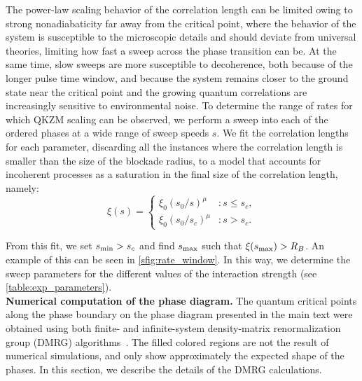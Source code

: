 \documentclass[prl,nobalancelastpage,superscriptaddress,twocolumn,nofootinbib]{revtex4}
\newcommand{\pargap}{\\[12pt]}
\begin{document}
The power-law scaling behavior of the correlation length can be limited owing to strong nonadiabaticity far away from the critical point, where the behavior of the system is susceptible to the microscopic details and should deviate from universal theories, limiting how fast a sweep across the phase transition can be. At the same time, slow sweeps are more susceptible to decoherence, both because of the longer pulse time window, and because the system remains closer to the ground state near the critical point and the growing quantum correlations are increasingly sensitive to environmental noise. To determine the range of rates for which QKZM scaling can be observed, we perform a sweep into each of the ordered phases at a wide range of sweep speeds $s$. We fit the correlation lengths for each parameter, discarding all the instances where the correlation length is smaller than the size of the blockade radius, to a model that accounts for incoherent processes as a saturation in the final size of the correlation length, namely:
\begin{equation}
\xi(s) = \begin{cases}
\xi_{0}(s_{0}/s)^{\mu} &: s\leq s_{c},\\
\xi_{0}(s_{0}/s_{c})^{\mu} &: s>s_{c}.
\end{cases}
\end{equation}

From this fit, we set $s_{\rm min} > s_{c}$ and find $s_{\rm max}$ such that $\xi(s_{\rm max}) > R_{B}$. An example of this can be seen in \ref{sfig:rate_window}. In this way, we determine the sweep parameters for the different values of the interaction strength (see \ref{table:exp_parameters}).
\pargap
\noindent\textbf{Numerical computation of the phase diagram.} The quantum critical points along the phase boundary on the phase diagram presented in the main text were obtained using both finite- and infinite-system density-matrix renormalization group (DMRG) algorithms~\cite{white1992density, white1993density,ostlund1995thermodynamic, rommer1997class, dukelsky1998equivalence,peschel1999density}. The filled colored regions are not the result of numerical simulations, and only show approximately the expected shape of the phases. In this section, we describe the details of the DMRG calculations.
\end{document}
